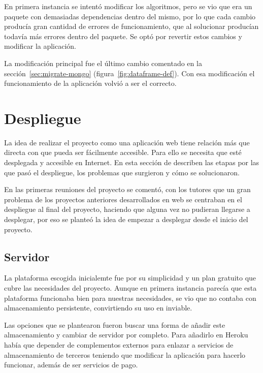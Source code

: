 En primera instancia se intentó modificar los algoritmos, pero se vio que era un
paquete con demasiadas dependencias dentro del mismo, por lo que cada cambio 
producía gran cantidad de errores de funcionamiento, que al solucionar 
producían todavía más errores dentro del paquete. Se optó por revertir estos
cambios y modificar la aplicación.

La modificación principal fue el último cambio comentado en la 
sección~\ref{sec:migrate-mongo} (figura~\ref{fig:dataframe-def}). Con esa 
modificación el funcionamiento de la aplicación volvió a ser el correcto.

\section{Despliegue}\label{sec:despliegue}

La idea de realizar el proyecto como una aplicación web tiene relación más que
directa con que pueda ser fácilmente accesible. Para ello se necesita que
esté desplegada y accesible en Internet. En esta sección de describen las etapas
por las que pasó el despliegue, los problemas que surgieron y cómo se
solucionaron.

En las primeras reuniones del proyecto se comentó, con los tutores que un gran
problema de los proyectos anteriores desarrollados en web se centraban en el
despliegue al final del proyecto, haciendo que alguna vez no pudieran llegarse a
desplegar, por eso se planteó la idea de empezar a desplegar desde el inicio del
proyecto.

\subsection{Servidor}

La plataforma escogida inicialemte fue 
 por su simplicidad y un plan 
gratuito que cubre las necesidades del proyecto. Aunque en primera instancia 
parecía que esta plataforma funcionaba bien para nuestras necesidades, se vio 
que no contaba con almacenamiento persistente, convirtiendo su uso en inviable.

Las opciones que se plantearon fueron buscar una forma de añadir este
almacenamiento y cambiar de servidor por completo. Para añadirlo en Heroku había
que depender de complementos externos para enlazar a servicios de 
almacenamiento de terceros teniendo que modificar la aplicación para hacerlo
funcionar, además de ser servicios de pago.

